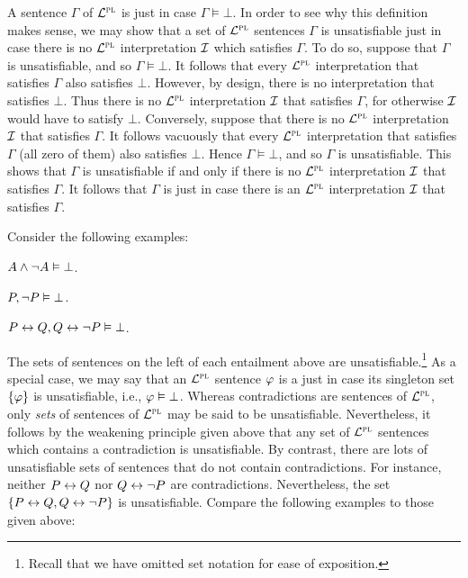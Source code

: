 A sentence $\Gamma$ of $\mathcal{L}^{\textsc{pl}}$ is  just in case $\Gamma \vDash \bot$.
In order to see why this definition makes sense, we may show that a set of $\mathcal{L}^{\textsc{pl}}$ sentences $\Gamma$ is unsatisfiable just in case there is no $\mathcal{L}^{\textsc{pl}}$ interpretation $\mathcal{I}$ which satisfies $\Gamma$.
To do so, suppose that $\Gamma$ is unsatisfiable, and so $\Gamma \vDash \bot$.
It follows that every $\mathcal{L}^{\textsc{pl}}$ interpretation that satisfies $\Gamma$ also satisfies $\bot$.
However, by design, there is no interpretation that satisfies $\bot$.
Thus there is no $\mathcal{L}^{\textsc{pl}}$ interpretation $\mathcal{I}$ that satisfies $\Gamma$, for otherwise $\mathcal{I}$ would have to satisfy $\bot$.
Conversely, suppose that there is no $\mathcal{L}^{\textsc{pl}}$ interpretation $\mathcal{I}$ that satisfies $\Gamma$.
It follows vacuously that every $\mathcal{L}^{\textsc{pl}}$ interpretation that satisfies $\Gamma$ (all zero of them) also satisfies $\bot$.
Hence $\Gamma \vDash \bot$, and so $\Gamma$ is unsatisfiable.
This shows that $\Gamma$ is unsatisfiable if and only if there is no $\mathcal{L}^{\textsc{pl}}$ interpretation $\mathcal{I}$ that satisfies $\Gamma$.
It follows that $\Gamma$ is  just in case there is an $\mathcal{L}^{\textsc{pl}}$ interpretation $\mathcal{I}$ that satisfies $\Gamma$.

Consider the following examples:

\begin{earg}
\item[] $A \wedge \neg A \vDash \bot$.
\item[] $P, \neg P \vDash \bot$.
\item[] $P \leftrightarrow Q, Q \leftrightarrow\neg P \vDash \bot$.
\end{earg}

The sets of sentences on the left of each entailment above are unsatisfiable.\footnote{Recall that we have omitted set notation for ease of exposition.}
As a special case, we may say that an $\mathcal{L}^{\textsc{pl}}$ sentence $\varphi$ is a  just in case its singleton set $\lbrace\varphi\rbrace$ is unsatisfiable, i.e., $\varphi \vDash \bot$.
Whereas contradictions are sentences of $\mathcal{L}^{\textsc{pl}}$, only \textit{sets} of sentences of $\mathcal{L}^{\textsc{pl}}$ may be said to be unsatisfiable.
Nevertheless, it follows by the weakening principle given above that any set of $\mathcal{L}^{\textsc{pl}}$ sentences which contains a contradiction is unsatisfiable.
By contrast, there are lots of unsatisfiable sets of sentences that do not contain contradictions.
For instance, neither $P \leftrightarrow Q$ nor $Q \leftrightarrow \neg P$ are contradictions. 
Nevertheless, the set $\lbrace P \leftrightarrow Q, Q \leftrightarrow \neg P\rbrace$ is unsatisfiable. 
Compare the following examples to those given above:

